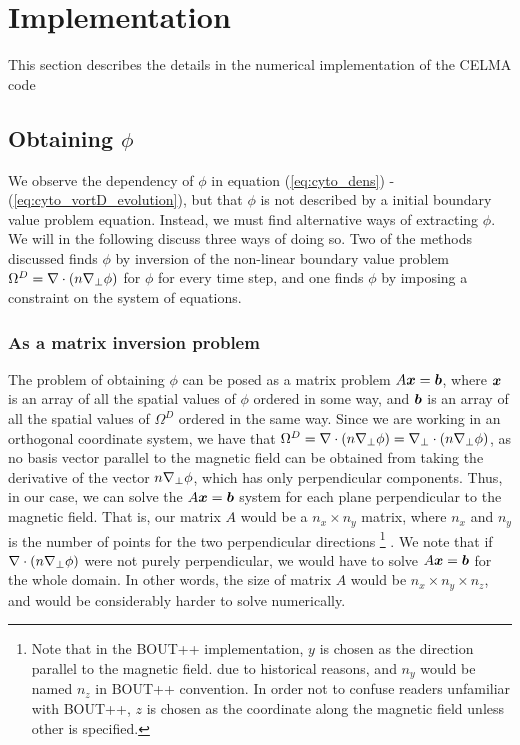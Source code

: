 \section{Implementation}
\label{sec:implementation}
This section describes the details in the numerical implementation of the CELMA
code

\subsection{Obtaining \texorpdfstring{$\phi$}{the potential}}
%
We observe the dependency of $\phi$ in equation (\ref{eq:cyto_dens}) -
(\ref{eq:cyto_vortD_evolution}), but that $\phi$ is not described by a
initial boundary value problem equation. Instead, we must find alternative ways
of extracting $\phi$. We will in the following discuss three ways of doing so.
Two of the methods discussed finds $\phi$ by inversion of the non-linear
boundary value problem $\Omega^D = \nabla\cdot\left(n\nabla_\perp\phi\right)$ for $\phi$ for
every time step, and one finds $\phi$ by imposing a constraint on the system of
equations.

\subsubsection{As a matrix inversion problem}
%
The problem of obtaining $\phi$ can be posed as a matrix problem
$A\boldsymbol{x}=\boldsymbol{b}$, where $\boldsymbol{x}$ is an array of all the spatial values of
$\phi$ ordered in some way, and $\boldsymbol{b}$ is an array of all the spatial values
of $\Omega^D$ ordered in the same way. Since we are working in an orthogonal
coordinate system, we have that $\Omega^D = \nabla\cdot\left(n\nabla_\perp\phi\right) =
\nabla_\perp\cdot\left(n\nabla_\perp\phi\right)$, as no basis vector parallel to the
magnetic field can be obtained from taking the derivative of the vector
$n\nabla_\perp\phi$, which has only perpendicular components. Thus, in our case,
we can solve the $A\boldsymbol{x}=\boldsymbol{b}$ system for each plane perpendicular to the
magnetic field. That is, our matrix $A$ would be a $n_x \times n_y$ matrix,
where $n_x$ and $n_y$ is the number of points for the two perpendicular
directions
%
\footnote{
Note that in the BOUT++ implementation, $y$ is chosen as the direction parallel
to the magnetic field.  due to historical reasons, and $n_y$ would be named
$n_z$ in BOUT++ convention.  In order not to confuse readers unfamiliar with
BOUT++, $z$ is chosen as the coordinate along the magnetic field unless other
is specified.
}%
%
. We note that if $\nabla\cdot\left(n\nabla_\perp\phi\right)$ were not purely
perpendicular, we would have to solve $A\boldsymbol{x}=\boldsymbol{b}$ for the whole domain. In
other words, the size of matrix $A$ would be $n_x \times n_y \times n_z$, and
would be considerably harder to solve numerically.

